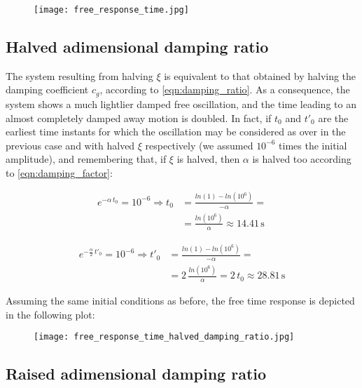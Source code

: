 \documentclass[a4paper,12pt,oneside]{article}
\begin{document}
\vspace{16pt}

\begin{figure}[h]
	\centering
	\texttt{[image: free\_response\_time.jpg]}
\end{figure}

\subsection{Halved adimensional damping ratio}

The system resulting from halving $ \xi $ is equivalent to that obtained by halving the damping coefficient $ c_g $, according to \eqref{eqn:damping_ratio}. As a consequence, the system shows a much lightlier damped free oscillation, and the time leading to an almost completely damped away motion is doubled. In fact, if $ t_0 $ and $ t'_0 $ are the earliest time instants for which the oscillation may be considered as over in the previous case and with halved $ \xi $ respectively (we assumed $ 10^{-6} $ times the initial amplitude), and remembering that, if $ \xi $ is halved, then $ \alpha $ is halved too according to \eqref{eqn:damping_factor}:

\[ \begin{split}
	e^{-\alpha \, t_0} = 10^{-6} \Rightarrow %
		t_0 & = \frac{ln(1) - ln(10^6)}{-\alpha} = \\
				& = \frac{ln(10^6)}{\alpha} \approx 14.41 \, \text{s}
\end{split} \]

\[ \begin{split}
	e^{-\frac{\alpha}{2} \, t'_0} = 10^{-6} \Rightarrow %
		t'_0 & = \frac{ln(1) - ln(10^6)}{-\alpha} = \\
				 & = 2 \, \frac{ln(10^6)}{\alpha} = 2 \, t_0 \approx 28.81 \, \text{s}
\end{split} \]

Assuming the same initial conditions as before, the free time response is depicted in the following plot:

\vspace{16pt}

\begin{figure}[h]
	\centering
	\texttt{[image: free\_response\_time\_halved\_damping\_ratio.jpg]}
\end{figure}

\subsection{Raised adimensional damping ratio}
\end{document}
